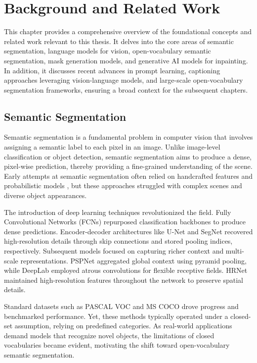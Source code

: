 \chapter{Background and Related Work} 
\label{ch:no_lineal}

This chapter provides a comprehensive overview of the foundational concepts and related work relevant to this thesis. It delves into the core areas of semantic segmentation, language models for vision, open-vocabulary semantic segmentation, mask generation models, and generative AI models for inpainting. In addition, it discusses recent advances in prompt learning, captioning approaches leveraging vision-language models, and large-scale open-vocabulary segmentation frameworks, ensuring a broad context for the subsequent chapters.

\section{Semantic Segmentation}
Semantic segmentation is a fundamental problem in computer vision that involves assigning a semantic label to each pixel in an image. Unlike image-level classification or object detection, semantic segmentation aims to produce a dense, pixel-wise prediction, thereby providing a fine-grained understanding of the scene. Early attempts at semantic segmentation often relied on handcrafted features and probabilistic models \cite{shotton2009textonboost}, but these approaches struggled with complex scenes and diverse object appearances.

The introduction of deep learning techniques revolutionized the field. Fully Convolutional Networks (FCNs) \cite{long2015fully} repurposed classification backbones \cite{krizhevsky2012imagenet,simonyan2014very,he2016deep} to produce dense predictions. Encoder-decoder architectures like U-Net \cite{ronneberger2015u} and SegNet \cite{badrinarayanan2017segnet} recovered high-resolution details through skip connections and stored pooling indices, respectively. Subsequent models focused on capturing richer context and multi-scale representations. PSPNet \cite{zhao2017pyramid} aggregated global context using pyramid pooling, while DeepLab \cite{chen2018encoder} employed atrous convolutions for flexible receptive fields. HRNet \cite{sun2019deep} maintained high-resolution features throughout the network to preserve spatial details.

Standard datasets such as PASCAL VOC \cite{everingham2010pascal} and MS COCO \cite{lin2014microsoft} drove progress and benchmarked performance. Yet, these methods typically operated under a closed-set assumption, relying on predefined categories. As real-world applications demand models that recognize novel objects, the limitations of closed vocabularies became evident, motivating the shift toward open-vocabulary semantic segmentation.

